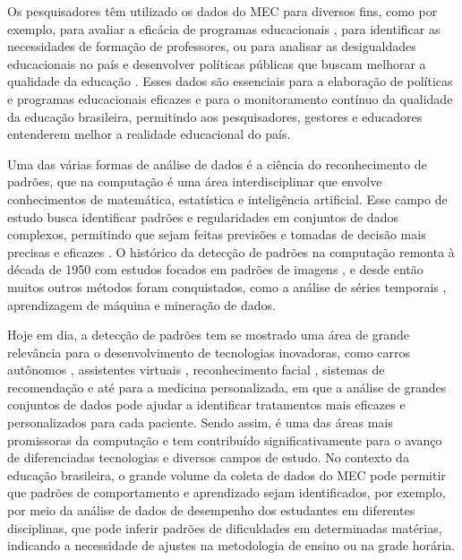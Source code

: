 Os pesquisadores têm utilizado os dados do MEC para diversos fins, como por exemplo, para avaliar a eficácia de programas educacionais \cite{VARGAS:2021}, para identificar as necessidades de formação de professores, ou para analisar as desigualdades educacionais no país e desenvolver políticas públicas que buscam melhorar a qualidade da educação \cite{santos:2019}. Esses dados são essenciais para a elaboração de políticas e programas educacionais eficazes e para o monitoramento contínuo da qualidade da educação brasileira, permitindo aos pesquisadores, gestores e educadores entenderem melhor a realidade educacional do país.

Uma das várias formas de análise de dados é a ciência do reconhecimento de padrões, que na computação é uma área interdisciplinar que envolve conhecimentos de matemática, estatística e inteligência artificial.  Esse campo de estudo busca identificar padrões e regularidades em conjuntos de dados complexos, permitindo que sejam feitas previsões e tomadas de decisão mais precisas e eficazes \cite{PAOLANTI:2020100276}. O histórico da detecção de padrões na computação remonta à década de 1950 com estudos focados em padrões de imagens \cite{selfridge:1955}, e desde então muitos outros métodos foram conquistados, como a análise de séries temporais \cite{guralnik:1999}, aprendizagem de máquina e mineração de dados.
    
Hoje em dia, a detecção de padrões tem se mostrado uma área de grande relevância para o desenvolvimento de tecnologias inovadoras, como carros autônomos \cite{carritos}, assistentes virtuais \cite{patternrec}, reconhecimento facial \cite{chen:2021}, sistemas de recomendação \cite{ahmed:2018} e até para a medicina personalizada, em que a análise de grandes conjuntos de dados pode ajudar a identificar tratamentos mais eficazes e personalizados para cada paciente.  Sendo assim, é uma das áreas mais promissoras da computação e tem contribuído significativamente para o avanço de diferenciadas tecnologias e diversos campos de estudo. No contexto da educação brasileira, o grande volume da coleta de dados do MEC pode permitir que padrões de comportamento e aprendizado sejam identificados, por exemplo, por meio da análise de dados de desempenho dos estudantes em diferentes disciplinas, que pode inferir padrões de dificuldades em determinadas matérias, indicando a necessidade de ajustes na metodologia de ensino ou na grade horária.
    
